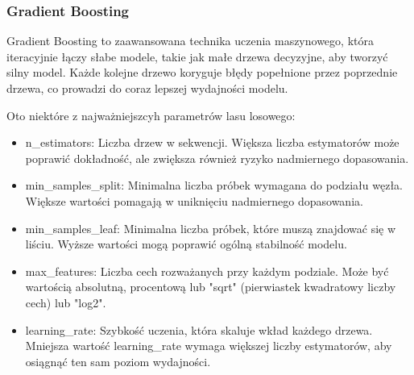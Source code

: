\documentclass{article}
\begin{document}
\subsubsection{Gradient Boosting}
Gradient Boosting \cite{gradient_boosting} to zaawansowana technika uczenia maszynowego, która iteracyjnie łączy słabe modele, takie jak małe drzewa decyzyjne, aby tworzyć silny model. Każde kolejne drzewo koryguje błędy popełnione przez poprzednie drzewa, co prowadzi do coraz lepszej wydajności modelu.

Oto niektóre z najważniejszcyh parametrów lasu losowego:
\begin{itemize}
    \item n\_estimators: Liczba drzew w sekwencji. Większa liczba estymatorów może poprawić dokładność, ale zwiększa również ryzyko nadmiernego dopasowania.
    \item min\_samples\_split: Minimalna liczba próbek wymagana do podziału węzła. Większe wartości pomagają w uniknięciu nadmiernego dopasowania.
    \item min\_samples\_leaf: Minimalna liczba próbek, które muszą znajdować się w liściu. Wyższe wartości mogą poprawić ogólną stabilność modelu.    
    \item max\_features: Liczba cech rozważanych przy każdym podziale. Może być wartością absolutną, procentową lub "sqrt" (pierwiastek kwadratowy liczby cech) lub "log2".
    \item learning\_rate: Szybkość uczenia, która skaluje wkład każdego drzewa. Mniejsza wartość learning\_rate wymaga większej liczby estymatorów, aby osiągnąć ten sam poziom wydajności.
\end{itemize}
\end{document}
